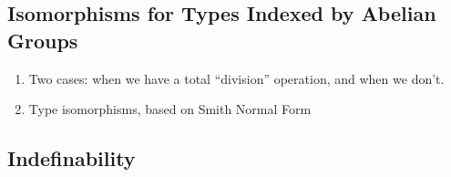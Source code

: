 \subsection{Isomorphisms for Types Indexed by Abelian Groups}
\label{sec:types-indexed-abelian-groups}

\begin{enumerate}
\item Two cases: when we have a total ``division'' operation, and when
  we don't.
\item Type isomorphisms, based on Smith Normal Form
\end{enumerate}


\subsection{Indefinability}


